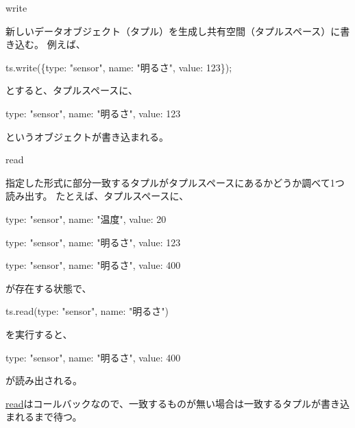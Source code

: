 write

新しいデータオブジェクト（タプル）を生成し共有空間（タプルスペース）に書き込む。
例えば、

ts.write(\{type: "sensor", name: "明るさ", value: 123\});

とすると、タプルスペースに、

{type: "sensor", name: "明るさ", value: 123}

というオブジェクトが書き込まれる。


read

指定した形式に部分一致するタプルがタプルスペースにあるかどうか調べて1つ読み出す。
たとえば、タプルスペースに、

{type: "sensor", name: "温度", value: 20}

{type: "sensor", name: "明るさ", value: 123}

{type: "sensor", name: "明るさ", value: 400}

が存在する状態で、

ts.read({type: "sensor", name: "明るさ"})

を実行すると、

{type: "sensor", name: "明るさ", value: 400}

が読み出される。

\url{read}はコールバックなので、一致するものが無い場合は一致するタプルが書き込まれるまで待つ。